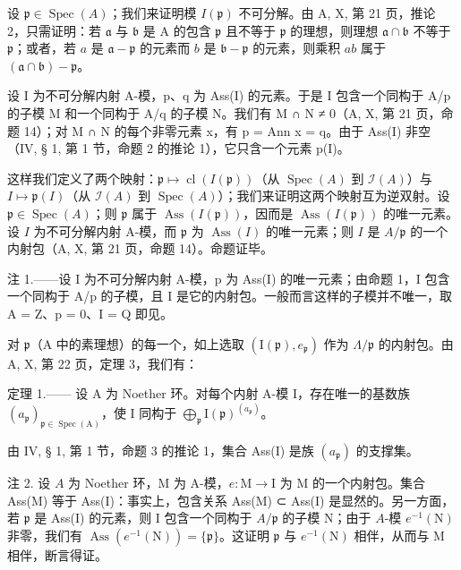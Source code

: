 设 \(\mathfrak{p} \in \operatorname{Spec}(A)\)；我们来证明模 \(I(\mathfrak{p})\) 不可分解。由 A, X, 第 21 页，推论 2，只需证明：若 \(\mathfrak{a}\) 与 \(\mathfrak{b}\) 是 A 的包含 \(\mathfrak{p}\) 且不等于 \(\mathfrak{p}\) 的理想，则理想 \(\mathfrak{a} \cap \mathfrak{b}\) 不等于 \(\mathfrak{p}\)；或者，若 \(a\) 是 \(\mathfrak{a} - \mathfrak{p}\) 的元素而 \(b\) 是 \(\mathfrak{b} - \mathfrak{p}\) 的元素，则乘积 \(ab\) 属于 \((\mathfrak{a} \cap \mathfrak{b}) - \mathfrak{p}\)。

设 I 为不可分解内射 A-模，p、q 为 Ass(I) 的元素。于是 I 包含一个同构于 A/p 的子模 M 和一个同构于 A/q 的子模 N。我们有 M ∩ N ≠ 0（A, X, 第 21 页，命题 14）；对 M ∩ N 的每个非零元素 x，有 p = Ann x = q。由于 Ass(I) 非空（IV, § 1, 第 1 节，命题 2 的推论 1），它只含一个元素 p(I)。

这样我们定义了两个映射：\(\mathfrak{p} \mapsto \operatorname{cl}(I(\mathfrak{p}))\)（从 \(\operatorname{Spec}(A)\) 到 \(\mathcal{I}(A)\)）与 \(I \mapsto \mathfrak{p}(I)\)（从 \(\mathcal{I}(A)\) 到 \(\operatorname{Spec}(A)\)）；我们来证明这两个映射互为逆双射。设 \(\mathfrak{p} \in \operatorname{Spec}(A)\)；则 \(\mathfrak{p}\) 属于 \(\operatorname{Ass}(I(\mathfrak{p}))\)，因而是 \(\operatorname{Ass}(I(\mathfrak{p}))\) 的唯一元素。设 \(I\) 为不可分解内射 A-模，而 \(\mathfrak{p}\) 为 \(\operatorname{Ass}(I)\) 的唯一元素；则 \(I\) 是 \(A/\mathfrak{p}\) 的一个内射包（A, X, 第 21 页，命题 14）。命题证毕。

注 1.——设 I 为不可分解内射 A-模，p 为 Ass(I) 的唯一元素；由命题 1，I 包含一个同构于 A/p 的子模，且 I 是它的内射包。一般而言这样的子模并不唯一，取 A = Z、p = 0、I = Q 即见。

对 \(\mathfrak{p}\)（\(\mathrm{A}\) 中的素理想）的每一个，如上选取 \((\mathrm{I}(\mathfrak{p}), e_{\mathfrak{p}})\) 作为 \(\Lambda/\mathfrak{p}\) 的内射包。由 \(\mathrm{A}\), X, 第 22 页，定理 3，我们有：

定理 1.—— 设 A 为 Noether 环。对每个内射 A-模 I，存在唯一的基数族 \((a_{\mathfrak{p}})_{\mathfrak{p}\in\operatorname{Spec}(\mathrm{A})}\)，使 I 同构于 \(\bigoplus_{\mathfrak{p}}\mathrm{I}(\mathfrak{p})^{(a_{\mathfrak{p}})}\)。

由 IV, § 1, 第 1 节，命题 3 的推论 1，集合 Ass(I) 是族 \((a_{\mathfrak{p}})\) 的支撑集。

注 2. 设 \(A\) 为 Noether 环，M 为 A-模，\(e: \mathrm{M} \to \mathrm{I}\) 为 M 的一个内射包。集合 Ass(M) 等于 Ass(I)：事实上，包含关系 Ass(M) ⊂ Ass(I) 是显然的。另一方面，若 \(\mathfrak{p}\) 是 Ass(I) 的元素，则 I 包含一个同构于 \(A/\mathfrak{p}\) 的子模 N；由于 \(A\)-模 \(e^{-1}(\mathrm{N})\) 非零，我们有 \(\operatorname{Ass}(e^{-1}(\mathrm{N})) = \{\mathfrak{p}\}\)。这证明 \(\mathfrak{p}\) 与 \(e^{-1}(\mathrm{N})\) 相伴，从而与 M 相伴，断言得证。

